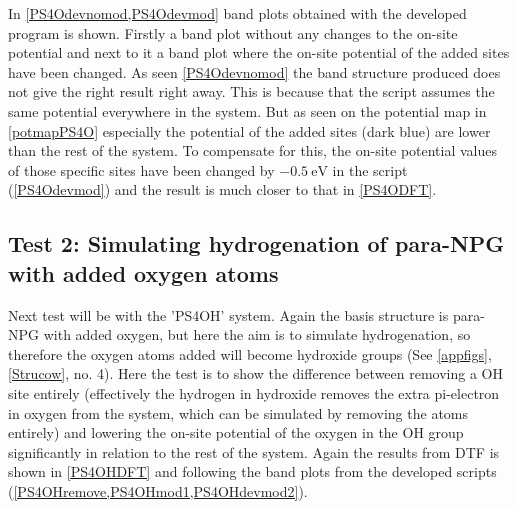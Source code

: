 In \cref{PS4Odevnomod,PS4Odevmod} band plots obtained with the developed program is shown. Firstly a band plot without any changes to the on-site potential and next to it a band plot where the on-site potential of the added sites have been changed. As seen \cref{PS4Odevnomod} the band structure produced does not give the right result right away. This is because that the script assumes the same potential everywhere in the system. But as seen on the potential map in \cref{potmapPS4O} especially the potential of the added sites (dark blue) are lower than the rest of the system. To compensate for this, the on-site potential values of those specific sites have been changed by \(\SI{-0.5}{\electronvolt}\) in the script (\cref{PS4Odevmod}) and the result is much closer to that in \cref{PS4ODFT}.
\subsection{Test 2: Simulating hydrogenation of para-NPG with added oxygen atoms}\label{test2}
Next test will be with the 'PS4OH' system. Again the basis structure is para-NPG with added oxygen, but here the aim is to simulate hydrogenation, so therefore the oxygen atoms added will become hydroxide groups (See \cref{appfigs}, \cref{Strucow}, no. 4). Here the test is to show the difference between removing a OH site entirely (effectively the hydrogen in hydroxide removes the extra pi-electron in oxygen from the system, which can be simulated by removing the atoms entirely) and lowering the on-site potential of the oxygen in the OH group significantly in relation to the rest of the system. Again the results from DTF is shown in \cref{PS4OHDFT} and following the band plots from the developed scripts (\cref{PS4OHremove,PS4OHmod1,PS4OHdevmod2}).
